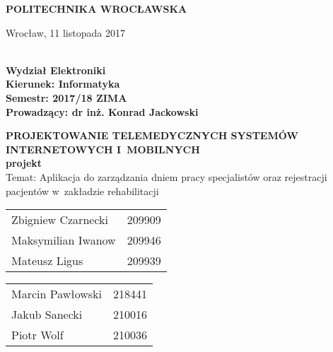 \begin{titlepage}
	
	\begin{center}
		\huge{\uppercase{\textbf{Politechnika Wrocławska}}}
	\end{center}

	\begin{flushright}
		Wrocław, 11 listopada 2017
	\end{flushright}

	\vspace{2cm}
	\begin{flushleft}
		\textbf{\\
			Wydział Elektroniki\\
			Kierunek: Informatyka\\
			Semestr: 2017/18 ZIMA\\
			Prowadzący: dr inż. Konrad Jackowski \\
		}
	\end{flushleft}
	
	\vspace{3cm}
	\begin{center}
		\textbf{
			\huge{\uppercase{Projektowanie telemedycznych systemów internetowych i~mobilnych}}\\
			\LARGE{projekt}
		}\\
		\huge{Temat: Aplikacja do zarządzania dniem pracy specjalistów oraz rejestracji pacjentów w~zakładzie rehabilitacji}
	\end{center}
	
	\vspace{5cm}
	\begin{multicols}{2}
		\begin{tabularx}{\textwidth}{ll}
			Zbigniew Czarnecki & 209909 \\
			Maksymilian Iwanow & 209946 \\
			Mateusz Ligus & 209939 \\
		\end{tabularx}
		\columnbreak
		\begin{tabularx}{\textwidth}{ll}
			Marcin Pawłowski & 218441 \\
			Jakub Sanecki & 210016 \\		
			Piotr Wolf & 210036 \\
		\end{tabularx}
	\end{multicols}

\end{titlepage}
